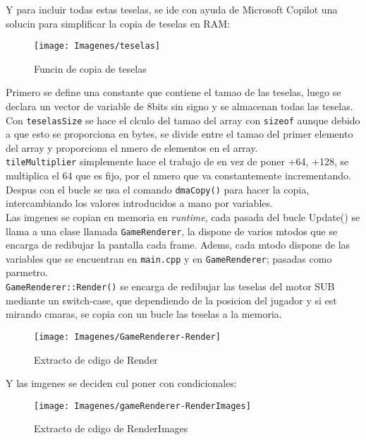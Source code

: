 \documentclass[12pt]{article}
\begin{document}
    Y para incluir todas estas teselas, se ide con ayuda de Microsoft Copilot \cite{copilot} una solucin para simplificar la copia de teselas en RAM:

    \begin{figure}[H]
      \centering
      \texttt{[image: Imagenes/teselas]}
      \caption{Funcin de copia de teselas}
      \label{fig:teselas}
    \end{figure}

    Primero se define una constante que contiene el tamao de las teselas, luego se declara un vector de variable de 8bits sin signo y se almacenan todas las teselas. \\

    Con \texttt{teselasSize} se hace el clculo del tamao del array con \texttt{sizeof} aunque debido a que esto se proporciona en bytes, se divide entre el tamao del primer elemento del array y proporciona el nmero de elementos en el array. \\

    \texttt{tileMultiplier} simplemente hace el trabajo de en vez de poner +64, +128, se multiplica el 64 que es fijo, por el nmero que va constantemente incrementando.\\

    Despus con el bucle se usa el comando \texttt{dmaCopy()} para hacer la copia, intercambiando los valores introducidos a mano por variables. \\

    Las imgenes se copian en memoria en \textit{runtime}, cada pasada del bucle Update() se llama a una clase llamada \texttt{GameRenderer}, la dispone de varios mtodos que se encarga de redibujar la pantalla cada frame. Adems, cada mtodo dispone de las variables que se encuentran en \texttt{main.cpp} y en \texttt{GameRenderer}; pasadas como parmetro. \\

    \texttt{GameRenderer::Render()} se encarga de redibujar las teselas del motor SUB mediante un switch-case, que dependiendo de la posicion del jugador y si est mirando cmaras, se copia con un bucle las teselas a la memoria.


    \begin{figure}[H]
      \centering
      \texttt{[image: Imagenes/GameRenderer-Render]}
      \caption{Extracto de cdigo de Render}
      \label{fig:gamerenderer-render}
    \end{figure}


    Y las imgenes se deciden cul poner con condicionales:
    \begin{figure}[H]
      \centering
      \texttt{[image: Imagenes/gameRenderer-RenderImages]}
      \caption{Extracto de cdigo de RenderImages}
      \label{fig:gamerenderer-renderimages}
    \end{figure}
\end{document}
